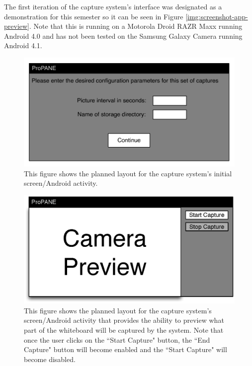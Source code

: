 \documentclass[]{article}
\begin{document}
					The first iteration of the capture system's interface was designated as a demonstration for this semester so it can be seen in Figure \ref{img:screenshot-app-preview}. Note that this is running on a Motorola Droid RAZR Maxx running Android 4.0 and has not been tested on the Samsung Galaxy Camera running Android 4.1. 
									
					\begin{figure}
						\centering
						\includegraphics{images/app-main-layout-eps-converted-to.pdf}
						\caption{This figure shows the planned layout for the capture system's initial screen/Android activity.}
						\label{img:app-main-layout}
					\end{figure}
					
					\begin{figure}
						\centering
						\includegraphics{images/app-preview-layout.eps}
						\caption{This figure shows the planned layout for the capture system's screen/Android activity that provides the ability to preview what part of the whiteboard will be captured by the system. Note that once the user clicks on the ``Start Capture" button, the ``End Capture" button will become enabled and the ``Start Capture" will become disabled.}
						\label{img:app-preview-layout}
					\end{figure}
					
\end{document}
